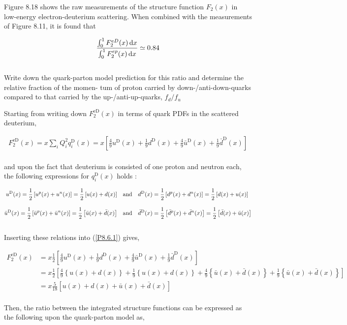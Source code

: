 \begin{problem}{8.6}
Figure 8.18 shows the raw measurements of the structure function $F_2(x)$ in low-energy electron-deuterium scattering. When combined with the measurements of Figure 8.11, it is found that

\begin{align*}
    \frac{\int_0^1 F^{eD}_2(x) \mathop{}\!\mathrm{d} x}{\int_0^1 F^{ep}_2(x) \mathop{}\!\mathrm{d} x} \simeq 0.84
\end{align*}\\
Write down the quark-parton model prediction for this ratio and determine the relative fraction of the momen- tum of proton carried by down-/anti-down-quarks compared to that carried by the up-/anti-up-quarks, $f_d/f_u$
\end{problem}
\begin{solution}
Starting from writing down $F_2^{\text{eD}}(x)$ in terms of quark PDFs in the scattered deuterium, 

    \begin{align}
        F_2^{\text{eD}}(x) = x \sum_i Q_i^2  q_i^\text{D}(x) = x \left[ \frac{4}{9} u^\text{D}(x) + \frac{1}{9} d^\text{D}(x) +  \frac{4}{9} \bar{u}^\text{D}(x) + \frac{1}{9} \bar{d}^\text{D}(x)  \right] \label{P8.6.1}
    \end{align}\\
    and upon the fact that deuterium is consisted of one proton and neutron each, the following expressions for $q_i^\text{D}(x)$ holds :

    \begin{align*}
        u^\text{D}(x) = \frac{1}{2}\left[ u^p(x) + u^n(x) \right] =  \frac{1}{2} \left[ u(x) + d(x) \right]  &\quad \text{and} \quad  d^\text{D}(x) =  \frac{1}{2} \left[ d^p(x) + d^n(x) \right] =  \frac{1}{2} \left[ d(x) + u(x) \right] \\[0.12in]
        \bar{u}^\text{D}(x) =  \frac{1}{2}\left[  \bar{u}^p(x) + \bar{u}^n(x) \right] =   \frac{1}{2} \left[ \bar{u}(x) + \bar{d}(x)  \right] &\quad \text{and} \quad  \bar{d}^\text{D}(x) =  \frac{1}{2}\left[  \bar{d}^p(x) + \bar{d}^n(x) \right] =  \frac{1}{2} \left[ \bar{d}(x) + \bar{u}(x)  \right]
    \end{align*}\\
    Inserting these relations into (\ref{P8.6.1}) gives, 

    \begin{align*}
        F_2^{\text{eD}}(x) &=  x \frac{1}{2} \left[ \frac{4}{9} u^\text{D}(x) + \frac{1}{9} d^\text{D}(x) +  \frac{4}{9} \bar{u}^\text{D}(x) + \frac{1}{9} \bar{d}^\text{D}(x)  \right] \\[0.12in]
        &= x  \frac{1}{2}  \left[ \frac{4}{9}  \left\{ u(x) + d(x)  \right\}  + \frac{1}{9}  \left\{ u(x) + d(x)  \right\}  +  \frac{4}{9} \left\{  \bar{u}(x) + \bar{d}(x) \right\} + \frac{1}{9} \left\{  \bar{u}(x) + \bar{d}(x) \right\}\right] \\[0.12in]
        &= x \frac{5}{18} \left[  u(x) + d(x) +  \bar{u}(x) + \bar{d}(x) \right]
    \end{align*}\\
    Then, the ratio between the integrated structure functions can be expressed as the following upon the quark-parton model as,


\end{solution}
